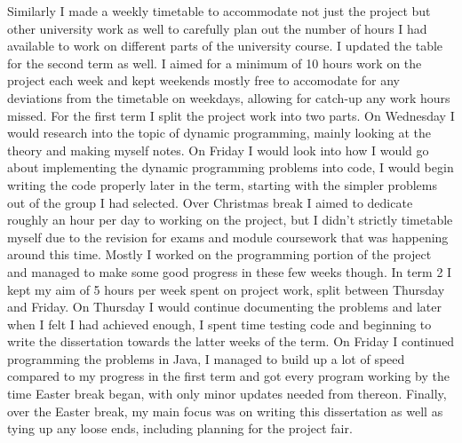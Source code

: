 Similarly I made a weekly timetable to accommodate not just the project but other university work as well to carefully plan out the number of hours I had available to work on different parts of the university course. I updated the table for the second term as well. I aimed for a minimum of 10 hours work on the project each week and kept weekends mostly free to accomodate for any deviations from the timetable on weekdays, allowing for catch-up any work hours missed. For the first term I split the project work into two parts. On Wednesday I would research into the topic of dynamic programming, mainly looking at the theory and making myself notes. On Friday I would look into how I would go about implementing the dynamic programming problems into code, I would begin writing the code properly later in the term, starting with the simpler problems out of the group I had selected.
\smallbreak
Over Christmas break I aimed to dedicate roughly an hour per day to working on the project, but I didn't strictly timetable myself due to the revision for exams and module coursework that was happening around this time. Mostly I worked on the programming portion of the project and managed to make some good progress in these few weeks though. In term 2 I kept my aim of 5 hours per week spent on project work, split between Thursday and Friday. On Thursday I would continue documenting the problems and later when I felt I had achieved enough, I spent time testing code and beginning to write the dissertation towards the latter weeks of the term. On Friday I continued programming the problems in Java, I managed to build up a lot of speed compared to my progress in the first term and got every program working by the time Easter break began, with only minor updates needed from thereon. Finally, over the Easter break, my main focus was on writing this dissertation as well as tying up any loose ends, including planning for the project fair.

